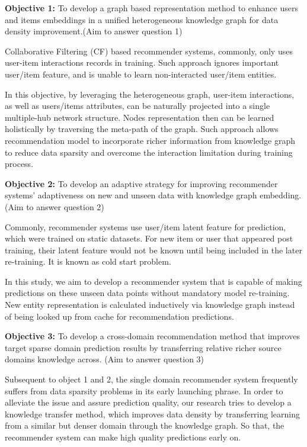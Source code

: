 \bigskip
\textbf{Objective 1:} To develop a graph based representation method to enhance users and items embeddings in a unified heterogeneous knowledge graph for data density improvement.(Aim to answer question 1)

Collaborative Filtering (CF) based recommender systems, commonly, only uses user-item interactions records in training. Such approach ignores important user/item feature, and is unable to learn non-interacted user/item entities. 

In this objective, by leveraging the heterogeneous graph, user-item interactions, as well as users/items attributes, can be naturally projected into a single multiple-hub network \citep{Shi2017} structure. Nodes representation then can be learned holistically by traversing the meta-path of the graph. Such approach allows recommendation model to incorporate richer information from knowledge graph to reduce data sparsity and overcome the interaction limitation during training process.


\bigskip
\textbf{Objective 2:} To develop an adaptive strategy for improving recommender systems’ adaptiveness on new and unseen data with knowledge graph embedding. (Aim to answer question 2)

Commonly, recommender systems use user/item latent feature for prediction, which were trained on static datasets. For new item or user that appeared post training, their latent feature would not be known until being included in the later re-training. It is known as cold start problem.

In this study, we aim to develop a recommender system that is capable of making predictions on these unseen data points without mandatory model re-training. New entity representation is calculated inductively via knowledge graph instead of being looked up from cache for recommendation predictions.


\bigskip
\textbf{Objective 3:} To develop a cross-domain recommendation method that improves target sparse domain prediction results by transferring relative richer source domains knowledge across. (Aim to answer question 3)

Subsequent to object 1 and 2, the single domain recommender system frequently suffers from data sparsity problems in its early launching phrase. In order to alleviate the issue and assure prediction quality, our research tries to develop a knowledge transfer method, which improves data density by transferring learning from a similar but denser domain through the knowledge graph. So that, the recommender system can make high quality predictions early on.


